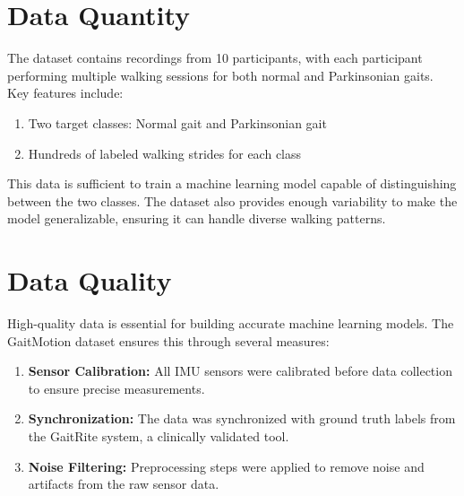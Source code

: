 \section{Data Quantity}
The dataset contains recordings from 10 participants, with each participant performing multiple walking sessions for both normal and Parkinsonian gaits. Key features include:
 \begin{enumerate}
 	\item Two target classes: Normal gait and Parkinsonian gait
    \item	Hundreds of labeled walking strides for each class
\end{enumerate}
This data is sufficient to train a machine learning model capable of distinguishing between the two classes. The dataset also provides enough variability to make the model generalizable, ensuring it can handle diverse walking patterns\cite{ZhangWenwen:2022}.

 \section{Data Quality}
 High-quality data is essential for building accurate machine learning models. The GaitMotion dataset ensures this through several measures:
\begin{enumerate}
	
	
	\item \textbf{Sensor Calibration:} All IMU sensors were calibrated before data collection to ensure precise measurements.
	\item \textbf{Synchronization:} The data was synchronized with ground truth labels from the GaitRite system, a clinically validated tool\cite{Webster:2005}.
	\item \textbf{Noise Filtering:} Preprocessing steps were applied to remove noise and artifacts from the raw sensor data\cite{ZhangWenwen:2022}.
\end{enumerate}
